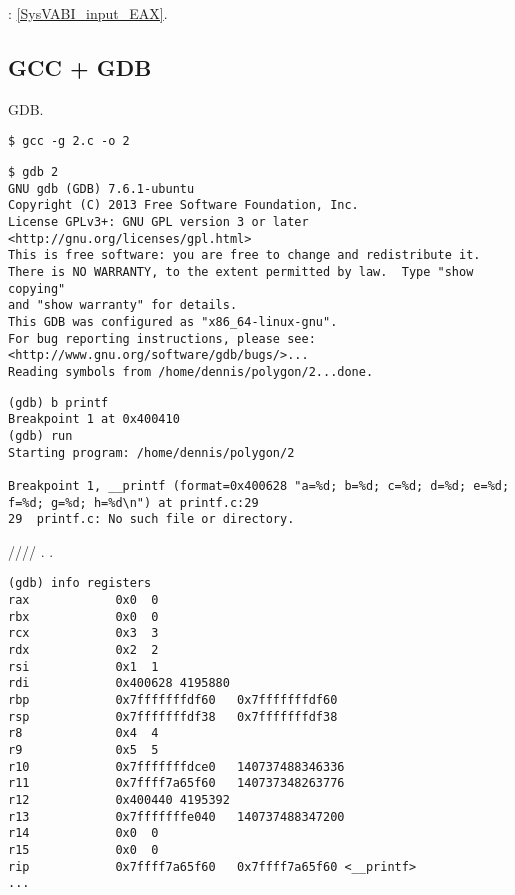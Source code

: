 : \ref{SysVABI_input_EAX}.



\subsection{GCC + GDB}

 \ac{GDB}.

\begin{lstlisting}
$ gcc -g 2.c -o 2
\end{lstlisting}

\begin{lstlisting}
$ gdb 2
GNU gdb (GDB) 7.6.1-ubuntu
Copyright (C) 2013 Free Software Foundation, Inc.
License GPLv3+: GNU GPL version 3 or later <http://gnu.org/licenses/gpl.html>
This is free software: you are free to change and redistribute it.
There is NO WARRANTY, to the extent permitted by law.  Type "show copying"
and "show warranty" for details.
This GDB was configured as "x86_64-linux-gnu".
For bug reporting instructions, please see:
<http://www.gnu.org/software/gdb/bugs/>...
Reading symbols from /home/dennis/polygon/2...done.
\end{lstlisting}

\begin{lstlisting}[caption=\RU{ставим брякпойнт на \printf, запускаем}\EN{let's set the breakpoint to \printf, and run}]
(gdb) b printf
Breakpoint 1 at 0x400410
(gdb) run
Starting program: /home/dennis/polygon/2 

Breakpoint 1, __printf (format=0x400628 "a=%d; b=%d; c=%d; d=%d; e=%d; f=%d; g=%d; h=%d\n") at printf.c:29
29	printf.c: No such file or directory.
\end{lstlisting}

 \RSI/\RDX/\RCX// 
.
\RIP {} \printf{}.

\begin{lstlisting}
(gdb) info registers
rax            0x0	0
rbx            0x0	0
rcx            0x3	3
rdx            0x2	2
rsi            0x1	1
rdi            0x400628	4195880
rbp            0x7fffffffdf60	0x7fffffffdf60
rsp            0x7fffffffdf38	0x7fffffffdf38
r8             0x4	4
r9             0x5	5
r10            0x7fffffffdce0	140737488346336
r11            0x7ffff7a65f60	140737348263776
r12            0x400440	4195392
r13            0x7fffffffe040	140737488347200
r14            0x0	0
r15            0x0	0
rip            0x7ffff7a65f60	0x7ffff7a65f60 <__printf>
...
\end{lstlisting}

